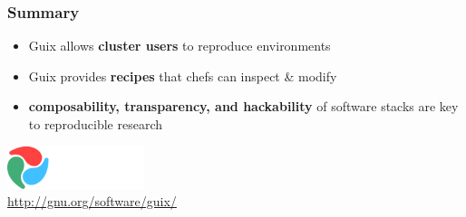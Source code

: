 \documentclass{beamer}
\newcommand{\highlight}[1]{\alert{\textbf{#1}}}
\begin{document}
\begin{frame}
  \frametitle{Summary}

  \Large{
    \begin{itemize}
    \item<1-> Guix allows \highlight{cluster users} to reproduce
      environments
    \item<2-> Guix provides \highlight{recipes} that chefs can
      inspect \& modify
    \item<3-> \highlight{composability, transparency, and hackability}
      of software stacks are key to reproducible research
    \end{itemize}
  }
\end{frame}

\begin{frame}[plain]
\end{frame}


\begin{frame}[plain]

\vfill{
  \vspace{6.5cm}
  \hfill{\includegraphics[width=0.3\textwidth]{images/guix-logo-white}}\\[0.2cm]
  \hfill{\alert{\url{http://gnu.org/software/guix/}}}
}

\end{frame}
\end{document}
